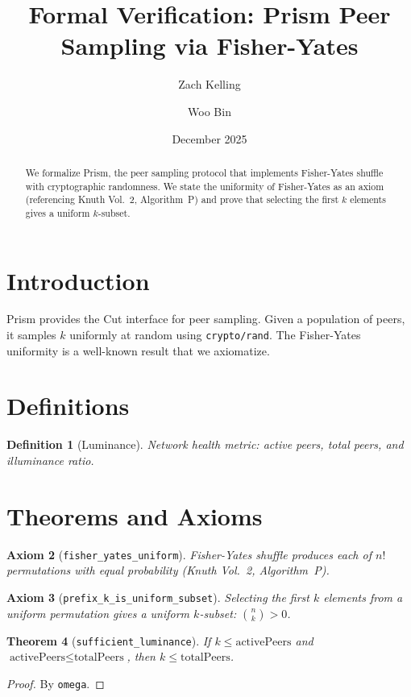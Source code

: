 \documentclass[11pt]{article}
\title{Formal Verification: Prism Peer Sampling via Fisher-Yates}
\author{Zach Kelling \and Woo Bin}
\date{December 2025}
\newtheorem{theorem}{Theorem}
\newtheorem{definition}[theorem]{Definition}
\newtheorem{axiom_stmt}[theorem]{Axiom}
\begin{document}
\maketitle

\begin{abstract}
We formalize Prism, the peer sampling protocol that implements Fisher-Yates shuffle with cryptographic randomness. We state the uniformity of Fisher-Yates as an axiom (referencing Knuth Vol.~2, Algorithm~P) and prove that selecting the first $k$ elements gives a uniform $k$-subset.
\end{abstract}

\section{Introduction}
Prism provides the Cut interface for peer sampling. Given a population of peers, it samples $k$ uniformly at random using \texttt{crypto/rand}. The Fisher-Yates uniformity is a well-known result that we axiomatize.

\section{Definitions}
\begin{definition}[Luminance]
Network health metric: active peers, total peers, and illuminance ratio.
\end{definition}


\section{Theorems and Axioms}
\begin{axiom_stmt}[\texttt{fisher\_yates\_uniform}]
Fisher-Yates shuffle produces each of $n!$ permutations with equal probability (Knuth Vol.~2, Algorithm~P).
\end{axiom_stmt}

\begin{axiom_stmt}[\texttt{prefix\_k\_is\_uniform\_subset}]
Selecting the first $k$ elements from a uniform permutation gives a uniform $k$-subset: $\binom{n}{k} > 0$.
\end{axiom_stmt}

\begin{theorem}[\texttt{sufficient\_luminance}]
If $k \leq \text{activePeers}$ and $\text{activePeers} \leq \text{totalPeers}$, then $k \leq \text{totalPeers}$.
\end{theorem}
\begin{proof}
By \texttt{omega}.
\end{proof}
\end{document}
